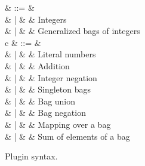 


\begin{figure}
\begin{syntax}
\beta & ::= & \\
     &  |  & \Int             & Integers\\
     &  |  & \Bag{\tau}        & Generalized bags of integers\\[\eqsep]

c    & ::= & \\
     &  |  &           & Literal numbers\\
     &  |  &    & Addition\\
     &  |  &         & Integer negation\\
     &  |  & 
                              & Singleton bags\\
     &  |  &  & Bag union\\
     &  |  &        & Bag negation\\
     &  |  &    & Mapping over a bag\\
     &  |  &           & Sum of elements of a bag
\end{syntax}
\caption{Plugin syntax.}
\label{fig:plug-syntax}
\end{figure}
